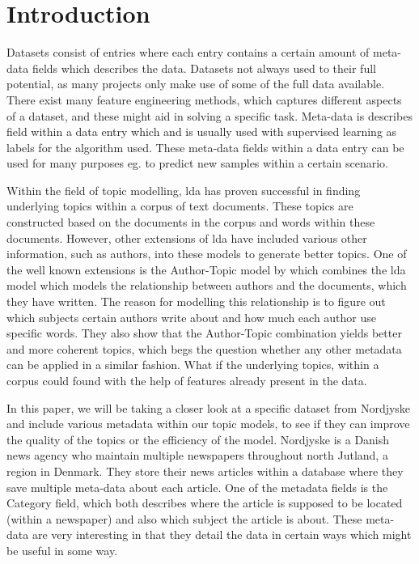 \section{Introduction}\label{sec:introduction}
Datasets consist of entries where each entry contains a certain amount of meta-data fields which describes the data.
Datasets not always used to their full potential, as many projects only make use of some of the full data available.
There exist many feature engineering methods, which captures different aspects of a dataset, and these might aid in solving a specific task.
Meta-data is describes field within a data entry which and is usually used with supervised learning as labels for the algorithm used.
These meta-data fields within a data entry can be used for many purposes eg. to predict new samples within a certain scenario.

Within the field of topic modelling, \Gls{lda} has proven successful in finding underlying topics within a corpus of text documents.
These topics are constructed based on the documents in the corpus and words within these documents. 
However, other extensions of \gls{lda} have included various other information, such as authors, into these models to generate better topics.
One of the well known extensions is the Author-Topic model by \citet{author_topic} which combines the \gls{lda} model which models the relationship between authors and the documents, which they have written.
The reason for modelling this relationship is to figure out which subjects certain authors write about and how much each author use specific words. 
They also show that the Author-Topic combination yields better and more coherent topics, which begs the question whether any other metadata can be applied in a similar fashion.
What if the underlying topics, within a corpus could found with the help of features already present in the data.

In this paper, we will be taking a closer look at a specific dataset from Nordjyske and include various metadata within our topic models, to see if they can improve the quality of the topics or the efficiency of the model.
Nordjyske is a Danish news agency who maintain multiple newspapers throughout north Jutland, a region in Denmark.
They store their news articles within a database where they save multiple meta-data about each article.
One of the metadata fields is the Category field, which both describes where the article is supposed to be located (within a newspaper) and also which subject the article is about.
These meta-data are very interesting in that they detail the data in certain ways which might be useful in some way.

